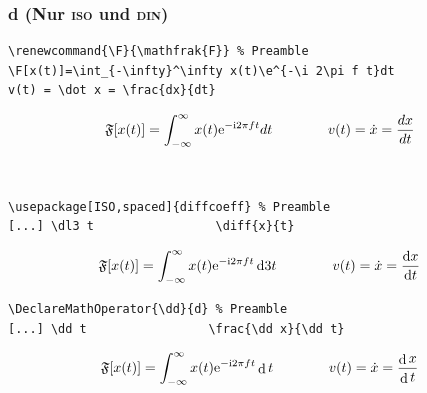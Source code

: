 \documentclass{beamer}
\DeclareMathOperator{\dd}{d}
\newcommand{\e}{\mathrm{e}}
\renewcommand{\i}{\mathrm{i}}
\begin{document}
\begin{frame}[fragile]
    \frametitle{d (Nur \textsc{iso} und \textsc{din})}
    \begin{wrong}
        \begin{lstlisting}
\renewcommand{\F}{\mathfrak{F}} % Preamble
\F[x(t)]=\int_{-\infty}^\infty x(t)\e^{-\i 2\pi f t}dt
v(t) = \dot x = \frac{dx}{dt}
        \end{lstlisting}
        \begin{equation*}
            \F[x(t)]=\int_{-\infty}^\infty x(t) \e^{-\i 2 \pi f t} d t
            \qquad\qquad
            v(t) = \dot x = \frac{dx}{dt}
        \end{equation*}
    \end{wrong}\\[2ex]
    \pause

    \begin{lstlisting}
\usepackage[ISO,spaced]{diffcoeff} % Preamble
[...] \dl3 t                 \diff{x}{t}
        \end{lstlisting}
    \begin{equation*}
        \F[x(t)]=\int_{-\infty}^\infty x(t)\e^{-\i 2 \pi f t}\dl3 t
        \qquad\qquad
        v(t) = \dot x = \diff{x}{t}
    \end{equation*}
    \pause

    \begin{lstlisting}
\DeclareMathOperator{\dd}{d} % Preamble
[...] \dd t                 \frac{\dd x}{\dd t}
        \end{lstlisting}
    \begin{equation*}
        \F[x(t)]=\int_{-\infty}^\infty x(t)\e^{-\i 2\pi f t}\dd t
        \qquad\qquad
        v(t) = \dot x = \frac{\dd x}{\dd t}
    \end{equation*}
\end{frame}
\end{document}
